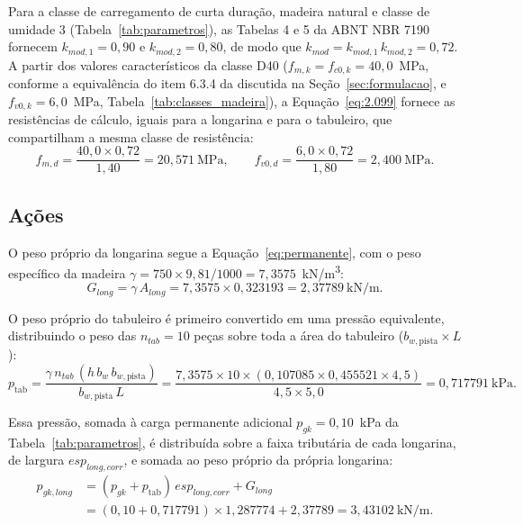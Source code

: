 \begin{appendices}
Para a classe de carregamento de curta duração, madeira natural e classe de umidade 3 (Tabela~\ref{tab:parametros}), as Tabelas 4 e 5 da ABNT NBR 7190 fornecem $k_{mod,1} = 0{,}90$ e $k_{mod,2} = 0{,}80$, de modo que $k_{mod} = k_{mod,1}\,k_{mod,2} = 0{,}72$.
A partir dos valores característicos da classe D40 ($f_{m,k} = f_{c0,k} = 40{,}0$~MPa, conforme a equivalência do item 6.3.4 da \textcite{NBR7190-1:2022} discutida na Seção~\ref{sec:formulacao}, e $f_{v0,k} = 6{,}0$~MPa, Tabela~\ref{tab:classes_madeira}), a Equação~\eqref{eq:2.099} fornece as resistências de cálculo, iguais para a longarina e para o tabuleiro, que compartilham a mesma classe de resistência:
\begin{equation*}
f_{m,d} = \frac{40{,}0 \times 0{,}72}{1{,}40} = 20{,}571~\text{MPa}, \qquad f_{v0,d} = \frac{6{,}0 \times 0{,}72}{1{,}80} = 2{,}400~\text{MPa}.
\end{equation*}

\subsection{Ações}

O peso próprio da longarina segue a Equação~\eqref{eq:permanente}, com o peso específico da madeira $\gamma = 750 \times 9{,}81/1000 = 7{,}3575$~kN/m\textsuperscript{3}:
\begin{equation*}
G_{long} = \gamma\,A_{long} = 7{,}3575 \times 0{,}323193 = 2{,}37789~\text{kN/m}.
\end{equation*}

O peso próprio do tabuleiro é primeiro convertido em uma pressão equivalente, distribuindo o peso das $n_{tab} = 10$ peças sobre toda a área do tabuleiro ($b_{w,\mathrm{pista}} \times L$):
\begin{equation*}
p_{\mathrm{tab}} = \frac{\gamma\,n_{tab}\,(h\,b_w\,b_{w,\mathrm{pista}})}{b_{w,\mathrm{pista}}\,L} = \frac{7{,}3575 \times 10 \times (0{,}107085 \times 0{,}455521 \times 4{,}5)}{4{,}5 \times 5{,}0} = 0{,}717791~\text{kPa}.
\end{equation*}

Essa pressão, somada à carga permanente adicional $p_{gk} = 0{,}10$~kPa da Tabela~\ref{tab:parametros}, é distribuída sobre a faixa tributária de cada longarina, de largura $esp_{long,corr}$, e somada ao peso próprio da própria longarina:
\begin{align*}
p_{gk,long} &= (p_{gk} + p_{\mathrm{tab}})\,esp_{long,corr} + G_{long} \\
&= (0{,}10 + 0{,}717791)\times 1{,}287774 + 2{,}37789 = 3{,}43102~\text{kN/m}.
\end{align*}


\end{appendices}
